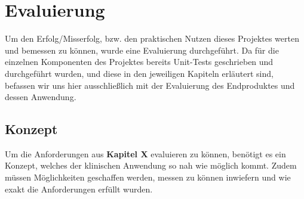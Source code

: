\chapter{Evaluierung}
Um den Erfolg/Misserfolg, bzw. den praktischen Nutzen dieses Projektes werten und bemessen zu können, wurde eine Evaluierung durchgeführt. Da für die einzelnen Komponenten des Projektes bereits Unit-Tests geschrieben und durchgeführt wurden, und diese in den jeweiligen Kapiteln erläutert sind, befassen wir uns hier ausschließlich mit der Evaluierung des Endproduktes und dessen Anwendung.
\section{Konzept}
Um die Anforderungen aus \textbf{Kapitel X} evaluieren zu können, benötigt es ein Konzept, welches der klinischen Anwendung so nah wie möglich kommt. Zudem müssen Möglichkeiten geschaffen werden, messen zu können inwiefern und wie exakt die Anforderungen erfüllt wurden.